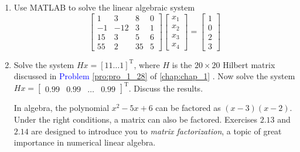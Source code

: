 \documentclass[../main.tex]{subfiles}
\begin{document}
\begin{enumerate}[label=\textbf{2.\arabic*}]
	\addtocounter{enumi}{10}
\item Use MATLAB to solve the linear algebraic system
$$
\left[\begin{array}{cccc}
1 & 3 & 8 & 0 \\
-1 & -12 & 3 & 1 \\
15 & 3 & 5 & 6 \\
55 & 2 & 35 & 5
\end{array}\right]\left[\begin{array}{l}
x_{1} \\
x_{2} \\
x_{3} \\
x_{4}
\end{array}\right]=\left[\begin{array}{l}
1 \\
0 \\
2 \\
3
\end{array}\right]
$$

\item Solve the system $H x=[11 \ldots 1]^{\mathrm{T}}$, where $H$ is the $20 \times 20$ Hilbert matrix discussed in \textcolor{blue}{Problem \ref{pro:pro_1_28}} of \autoref{chap:chap_1} . Now solve the system $H x=\left[\begin{array}{llll}0.99 & 0.99 & \ldots & 0.99\end{array}\right]^{\mathrm{T}}$. Discuss the results.

In algebra, the polynomial $x^{2}-5 x+6$ can be factored as $(x-3)(x-2)$. Under the right conditions, a matrix can also be factored. Exercises $2.13$ and $2.14$ are designed to introduce you to \emph{matrix factorization}, a topic of great importance in numerical linear algebra.




\end{enumerate}
\end{document}
